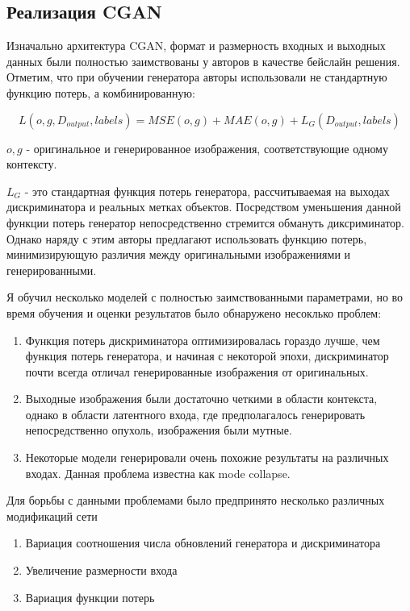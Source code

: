 \subsection{Реализация CGAN}

Изначально архитектура CGAN, формат и размерность входных и выходных данных были полностью заимствованы у авторов \cite{mirsky} в качестве бейслайн решения. Отметим, что при обучении генератора авторы использовали не стандартную функцию потерь, а комбинированную:

\begin{equation}
L(o, g, D_{output}, labels) = MSE(o, g) + MAE(o, g) + L_{G}(D_{output}, labels)
\end{equation}

$o, g$ - оригинальное и генерированное изображения, соответствующие одному контексту.

$L_{G}$ - это стандартная функция потерь генератора, рассчитываемая на выходах дискриминатора и реальных метках объектов. Посредством уменьшения данной функции потерь генератор непосредственно стремится обмануть диксриминатор. Однако наряду с этим авторы предлагают использовать функцию потерь, минимизирующую различия между оригинальными изображениями и генерированными.

Я обучил несколько моделей с полностью заимствованными параметрами, но во время обучения и оценки результатов было обнаружено несоклько проблем:

\begin{enumerate}
    \item Функция потерь дискриминатора оптимизировалась гораздо лучше, чем функция потерь генератора, и начиная с некоторой эпохи, дискриминатор почти всегда отличал генерированные изображения от оригинальных.
    
    \item Выходные изображения были достаточно четкими в области контекста, однако в области латентного входа, где предполагалось генерировать непосредственно опухоль, изображения были мутные.
    
    \item Некоторые модели генерировали очень похожие результаты на различных входах. Данная проблема известна как mode collapse.
\end{enumerate}

Для борьбы с данными проблемами было предпринято несколько различных модификаций сети

\begin{enumerate}
    \item Вариация соотношения числа обновлений генератора и дискриминатора
    \item Увеличение размерности входа 
    \item Вариация функции потерь
\end{enumerate}

